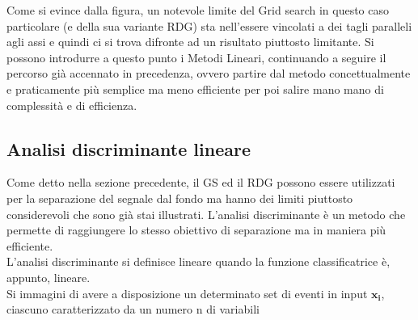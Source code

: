 Come si evince dalla figura, un notevole limite del Grid search in questo caso particolare (e della sua variante RDG) sta nell'essere vincolati a dei tagli paralleli agli assi e quindi ci si trova difronte ad un risultato piuttosto limitante. Si possono introdurre a questo punto i Metodi Lineari, continuando a seguire il percorso già accennato in precedenza, ovvero partire dal metodo concettualmente e praticamente più semplice ma meno efficiente per poi salire mano mano di complessità e di efficienza.\\

\newpage

\subsection{Analisi discriminante lineare}
\label{metodi lineari e discriminante di Fisher}

Come detto nella sezione precedente, il GS ed il RDG possono essere utilizzati per la separazione del segnale dal fondo ma hanno dei limiti piuttosto considerevoli che sono già stai illustrati. L'analisi discriminante è un metodo che permette di raggiungere lo stesso obiettivo di separazione ma in maniera più efficiente. \\
L'analisi discriminante si definisce lineare quando la funzione classificatrice è, appunto, lineare. \\
Si immagini di avere a disposizione un determinato set di eventi in input $\textbf{x}_\textbf{i}$, ciascuno caratterizzato da un numero n di variabili 


